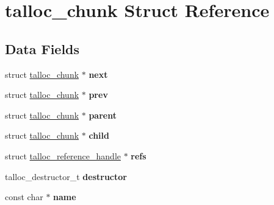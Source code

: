 \hypertarget{structtalloc__chunk}{}\section{talloc\+\_\+chunk Struct Reference}
\label{structtalloc__chunk}
\subsection*{Data Fields}
\begin{DoxyCompactItemize}
\item 
\hypertarget{structtalloc__chunk_a454a75a289c947c18c04a2d68f45a263}{}struct \hyperlink{structtalloc__chunk}{talloc\+\_\+chunk} $\ast$ {\bfseries next}\label{structtalloc__chunk_a454a75a289c947c18c04a2d68f45a263}

\item 
\hypertarget{structtalloc__chunk_a20028d005b51e68a02d3186ce0e94a5d}{}struct \hyperlink{structtalloc__chunk}{talloc\+\_\+chunk} $\ast$ {\bfseries prev}\label{structtalloc__chunk_a20028d005b51e68a02d3186ce0e94a5d}

\item 
\hypertarget{structtalloc__chunk_adbd11ff3c4e4faa1d0d511ba2bd39cbf}{}struct \hyperlink{structtalloc__chunk}{talloc\+\_\+chunk} $\ast$ {\bfseries parent}\label{structtalloc__chunk_adbd11ff3c4e4faa1d0d511ba2bd39cbf}

\item 
\hypertarget{structtalloc__chunk_abc68bdf71abd0d88985620d7baa6ef37}{}struct \hyperlink{structtalloc__chunk}{talloc\+\_\+chunk} $\ast$ {\bfseries child}\label{structtalloc__chunk_abc68bdf71abd0d88985620d7baa6ef37}

\item 
\hypertarget{structtalloc__chunk_a1bc51a4a808d404f86b58ced314e258b}{}struct \hyperlink{structtalloc__reference__handle}{talloc\+\_\+reference\+\_\+handle} $\ast$ {\bfseries refs}\label{structtalloc__chunk_a1bc51a4a808d404f86b58ced314e258b}

\item 
\hypertarget{structtalloc__chunk_ab4f4fca553fbaf7f80372933f1727958}{}talloc\+\_\+destructor\+\_\+t {\bfseries destructor}\label{structtalloc__chunk_ab4f4fca553fbaf7f80372933f1727958}

\item 
\hypertarget{structtalloc__chunk_a4618fa2361ea40a237d7bdbff77cf57b}{}const char $\ast$ {\bfseries name}\label{structtalloc__chunk_a4618fa2361ea40a237d7bdbff77cf57b}


\end{DoxyCompactItemize}
